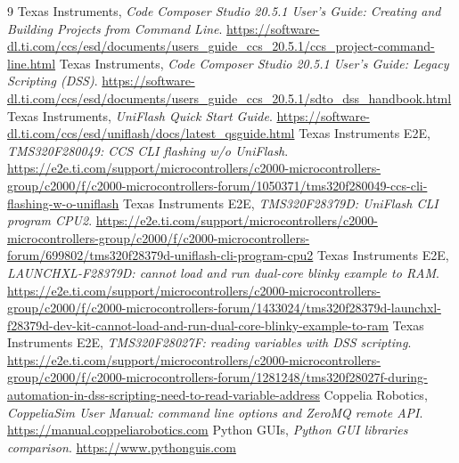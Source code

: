 \documentclass[12pt,letterpaper]{article}
\begin{document}
\begin{thebibliography}{9}
 Texas Instruments, \textit{Code Composer Studio 20.5.1 User's Guide: Creating and Building Projects from Command Line}. \url{https://software-dl.ti.com/ccs/esd/documents/users_guide_ccs_20.5.1/ccs_project-command-line.html}
 Texas Instruments, \textit{Code Composer Studio 20.5.1 User's Guide: Legacy Scripting (DSS)}. \url{https://software-dl.ti.com/ccs/esd/documents/users_guide_ccs_20.5.1/sdto_dss_handbook.html}
 Texas Instruments, \textit{UniFlash Quick Start Guide}. \url{https://software-dl.ti.com/ccs/esd/uniflash/docs/latest_qsguide.html}
 Texas Instruments E2E, \textit{TMS320F280049: CCS CLI flashing w/o UniFlash}. \url{https://e2e.ti.com/support/microcontrollers/c2000-microcontrollers-group/c2000/f/c2000-microcontrollers-forum/1050371/tms320f280049-ccs-cli-flashing-w-o-uniflash}
 Texas Instruments E2E, \textit{TMS320F28379D: UniFlash CLI program CPU2}. \url{https://e2e.ti.com/support/microcontrollers/c2000-microcontrollers-group/c2000/f/c2000-microcontrollers-forum/699802/tms320f28379d-uniflash-cli-program-cpu2}
 Texas Instruments E2E, \textit{LAUNCHXL-F28379D: cannot load and run dual-core blinky example to RAM}. \url{https://e2e.ti.com/support/microcontrollers/c2000-microcontrollers-group/c2000/f/c2000-microcontrollers-forum/1433024/tms320f28379d-launchxl-f28379d-dev-kit-cannot-load-and-run-dual-core-blinky-example-to-ram}
 Texas Instruments E2E, \textit{TMS320F28027F: reading variables with DSS scripting}. \url{https://e2e.ti.com/support/microcontrollers/c2000-microcontrollers-group/c2000/f/c2000-microcontrollers-forum/1281248/tms320f28027f-during-automation-in-dss-scripting-need-to-read-variable-address}
 Coppelia Robotics, \textit{CoppeliaSim User Manual: command line options and ZeroMQ remote API}. \url{https://manual.coppeliarobotics.com}
 Python GUIs, \textit{Python GUI libraries comparison}. \url{https://www.pythonguis.com}
\end{thebibliography}
\end{document}
